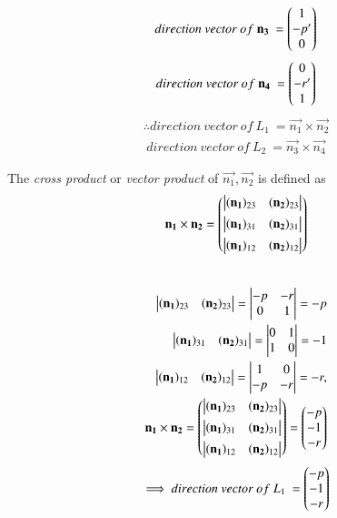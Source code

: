 \documentclass[journal]{IEEEtran}
\begin{document}
\begin{align}
    direction\ vector\ of\ \mathbf{n_3}\ = \begin{pmatrix}1\\-p^{\prime}\\0\end{pmatrix}
\end{align}
\begin{align}
    direction\ vector\ of\ \mathbf{n_4}\ = \begin{pmatrix}0\\-r^{\prime}\\1\end{pmatrix}
\end{align}
\newpage
\begin{align}
    \therefore direction\ vector\ of\ L_1\ = \vec{n_1} \times \vec{n_2} 
\end{align}
\begin{align}
    direction\ vector\ of\ L_2\ = \vec{n_3} \times \vec{n_4} 
\end{align}
\bigskip

The {\em cross product} or {\em vector product} of $\vec{n_1}, \vec{n_2}$ is defined as
\begin{align}
  \label{eq:cross3d}
	\mathbf{n_1} \times \mathbf{n_2} 
	 = \begin{pmatrix} \begin{vmatrix}(\mathbf{n_1})_{23} & (\mathbf{n_2})_{23}\end{vmatrix} \\[1ex] \begin{vmatrix}(\mathbf{n_1})_{31} & (\mathbf{n_2})_{31}\end{vmatrix} \\[1ex] \begin{vmatrix}(\mathbf{n_1})_{12}  & (\mathbf{n_2})_{12}\end{vmatrix}\end{pmatrix}
\end{align}\\
\begin{align}
	\begin{vmatrix}(\mathbf{n_1})_{23}&(\mathbf{n_2})_{23}\end{vmatrix}=\begin{vmatrix}-p & -r \\ 0 & 1\end{vmatrix}=-p\\\
	\begin{vmatrix}(\mathbf{n_1})_{31}&(\mathbf{n_2})_{31}\end{vmatrix}=\begin{vmatrix}0 & 1 \\ 1 & 0\end{vmatrix}=-1\\
	\begin{vmatrix}(\mathbf{n_1})_{12}&(\mathbf{n_2})_{12}\end{vmatrix}=\begin{vmatrix}1 & 0 \\ -p & -r\end{vmatrix}=-r,
	\\
	\mathbf{n_1}\times\mathbf{n_2}
	 =\begin{pmatrix} \begin{vmatrix}(\mathbf{n_1})_{23} & (\mathbf{n_2})_{23}\end{vmatrix} \\[1ex] \begin{vmatrix}(\mathbf{n_1})_{31} & (\mathbf{n_2})_{31}\end{vmatrix} \\[1ex] \begin{vmatrix}(\mathbf{n_1})_{12}  & (\mathbf{n_2})_{12}\end{vmatrix}\end{pmatrix}
=\begin{pmatrix}-p\\-1\\-r\end{pmatrix}
\end{align}
\begin{align}
    \implies direction\ vector\ of\ L_1\ = \begin{pmatrix}-p\\-1\\-r\end{pmatrix}
\end{align}\\
\bigskip
\end{document}
